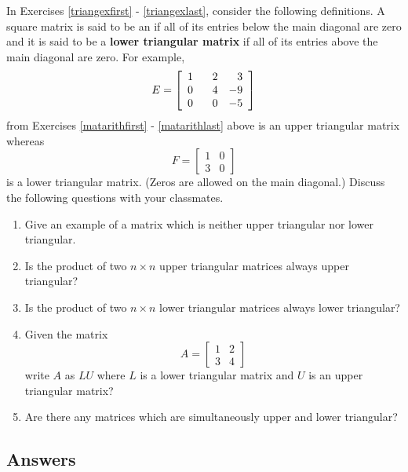 \documentclass{ximera}
\begin{document}
\label{triangularmatrices}

In Exercises \ref{triangexfirst} - \ref{triangexlast}, consider the following definitions. A square matrix is said to be an  if all of its entries below the main diagonal are zero and it is said to be a {\bf lower triangular matrix} if all of its entries above the main diagonal are zero. For example, \[E = \left[ \begin{array}{rrr} 1 & \hphantom{-}2 & 3 \\ 0 & 4 & -9 \\ 0 & 0 & -5 \end{array} \right]\] from Exercises \ref{matarithfirst} - \ref{matarithlast} above is an upper triangular matrix whereas \[F = \left[ \begin{array}{rr} 1 & 0 \\ 3 & 0 \end{array} \right]\] is a lower triangular matrix.  (Zeros are allowed on the main diagonal.)  Discuss the following questions with your classmates.

\begin{enumerate}
\setcounter{enumi}{\value{HW}}

\item Give an example of a matrix which is neither upper triangular nor lower triangular. \label{triangexfirst} 
\item Is the product of two $n \times n$ upper triangular matrices always upper triangular?
\item Is the product of two $n \times n$ lower triangular matrices always lower triangular?
\item Given the matrix \[A = \left[ \begin{array}{rr} 1 & 2 \\ 3 & 4 \end{array} \right]\] write $A$ as $LU$ where $L$ is a lower triangular matrix and $U$ is an upper triangular matrix?
\item Are there any matrices which are simultaneously upper and lower triangular? \label{triangexlast}

\setcounter{HW}{\value{enumi}}
\end{enumerate}


\newpage

\subsection{Answers}
\end{document}
